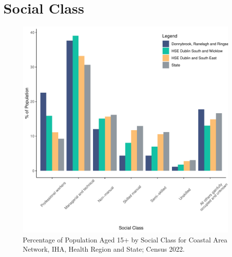 \documentclass{article}
\begin{document}
\section{Social Class}\label{sect:SC}
\begin{figure}[H]
	\centering
	\includegraphics[width = 140mm]{../figures/SocialClassED.pdf}
	\caption{Percentage of Population Aged 15+ by Social Class for Coastal Area Network, IHA, Health Region and State; Census 2022.}
	\label{fig:vbnv}
	\end{figure}
\end{document}
